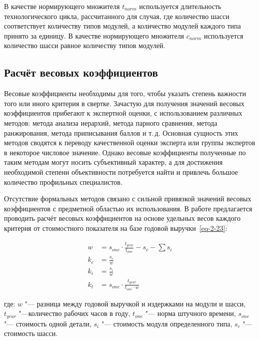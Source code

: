 В качестве нормирующего множителя $t_{norm}$ используется длительность технологического цикла, рассчитанного для случая, где количество шасси соответствует количеству типов модулей, а количество модулей каждого типа принято за единицу. В качестве нормирующего множителя $c_{norm}$ используется количество шасси равное количеству типов модулей.

\subsection{Расчёт весовых коэффициентов}\label{sec:weight}

Весовые коэффициенты необходимы для того, чтобы указать степень важности того или иного критерия в свертке. Зачастую для получения значений весовых коэффициентов прибегают к экспертной оценки, с использованием различных методов: метода анализа иерархий, метода парного сравнения, метода ранжирования, метода приписывания баллов и т.\,д. Основная сущность этих методов сводятся к переводу качественной оценки эксперта или группы экспертов в некоторое числовое значение.  Однако весовые коэффициенты полученные по таким методам могут носить субъективный характер, а для достижения необходимой степени объективности потребуется найти и привлечь большое количество профильных специалистов.

Отсутствие формальных методов связано с сильной привязкой значений весовых коэффициентов с предметной областью их использования. В работе предлагается проводить расчёт весовых коэффициентов на основе удельных весов каждого критерия от стоимостного показателя на базе годовой выручки~\cref{eq-2-23}:

\begin{equation}
\begin{split}
	w   &= s_{one} \cdot \frac{t_{year}}{t_{one}} - s_c - \sum s_i \\
	k_c &= \frac{s_c}{w} \\
	k_i &= \frac{s_i}{w} \\
	k_t &= s_{one} \cdot \frac{t_{year}}{t_{one} \cdot w}
\end{split}
\label{eq-2-23}
\end{equation}

\noindent где:
\noindent $w$ "--- разница между годовой выручкой и издержками на модули и шасси,
\noindent $t_{year}$ "---количество рабочих часов в году,
\noindent $t_{one}$ "--- норма штучного времени,
\noindent $s_{one}$ "--- стоимость одной детали,
\noindent $s_i$ "--- стоимость модуля определенного типа,
\noindent $s_c$ "--- стоимость шасси.

